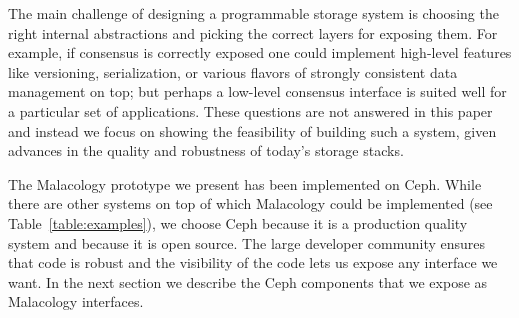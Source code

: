 The main challenge of designing a programmable storage system is choosing the
right internal abstractions and picking the correct layers for exposing them.
   For example, if consensus is
correctly exposed one could implement high-level features like versioning,
serialization, or various flavors of strongly consistent data management on
top; but perhaps a low-level consensus interface is suited well for a
particular set of applications.  These questions are not answered in this paper
and instead we focus on showing the feasibility of building such a system,
given advances in the quality and robustness of today's storage stacks.

The Malacology prototype we present has been implemented on Ceph.  While there
are other systems on top of which Malacology could be implemented (see
Table~\ref{table:examples}), we choose Ceph because it is a production quality
system and because it is open source. The large developer community ensures
that code is robust and the visibility of the code lets us expose any interface
we want. In the next section we describe the Ceph components that we expose as
Malacology interfaces.
